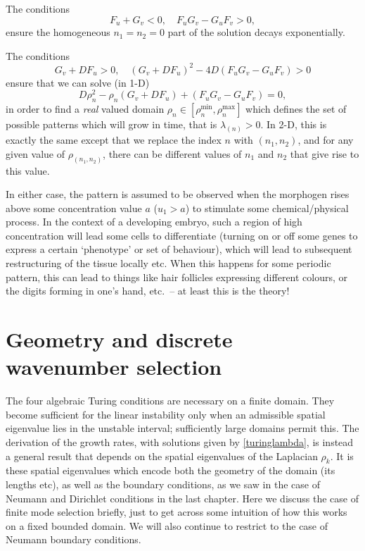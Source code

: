 \documentclass[main.tex]{subfiles}
\begin{document}
The conditions 
\begin{equation}
F_u +G_v <0, \quad F_uG_v  -G_uF_v> 0,
\end{equation}
ensure the homogeneous $n_1=n_2=0$ part of the solution decays exponentially.

The conditions 
\begin{equation}
G_v + DF_u>0,\quad (G_v+ D F_u)^2 - 4 D (F_uG_v  -G_uF_v) >0
\end{equation}
ensure that we can solve (in 1-D)
\begin{equation}
 D\rho_n^2  -  \rho_n(G_v+ D F_u)+ (F_uG_v  -G_uF_v)= 0,
\end{equation}
in order to find a \emph{real} valued domain $\rho_n \in[\rho_n^{\min},\rho_n^{\max}]$ which defines the set of possible patterns which will grow in time, that is $\lambda_{(n)}>0$. In 2-D, this is exactly the same except that we replace the index $n$ with $(n_1, n_2)$, and for any given value of $\rho_{(n_1, n_2)}$, there can be different values of $n_1$ and $n_2$ that give rise to this value. 


In either case, the pattern is assumed to be observed when the morphogen rises above some concentration value $a$ ($u_1>a$) to stimulate some chemical/physical process. In the context of a developing embryo, such a region of high concentration will lead some cells to differentiate (turning on or off some genes to express a certain `phenotype' or set of behaviour), which will lead to subsequent restructuring of the tissue locally etc. When this happens for some periodic pattern, this can lead to things like hair follicles expressing different colours, or the digits forming in one's hand, etc.\ -- at least this is the theory! 

\section{Geometry and discrete wavenumber selection}
The four algebraic Turing conditions are necessary on a finite domain. They become sufficient for the linear instability only when an admissible spatial eigenvalue lies in the unstable interval; sufficiently large domains permit this. The derivation of the growth rates, with solutions given by \cref{turinglambda}, is instead a general result that depends on the spatial eigenvalues of the Laplacian $\rho_k$. It is these spatial eigenvalues which encode both the geometry of the domain (its lengths etc), as well as the boundary conditions, as we saw in the case of Neumann and Dirichlet conditions in the last chapter. Here we discuss the case of finite mode selection briefly, just to get across some intuition of how this works on a fixed bounded domain. We will also continue to restrict to the case of Neumann boundary conditions.
\end{document}
